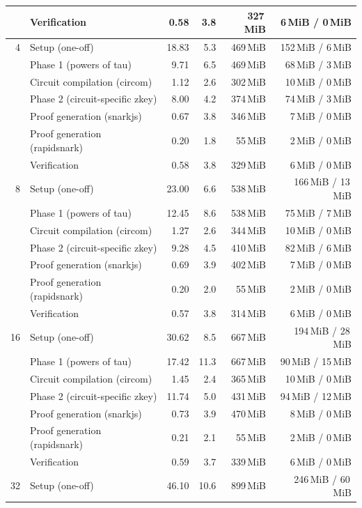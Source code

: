 \begin{table}[t]
{\begin{tabular}{|r|l|r|r|r|r|}
 & Verification & 0.58 & 3.8 & 327\,MiB & 6\,MiB / 0\,MiB \\
\hline
4 & Setup (one-off) & 18.83 & 5.3 & 469\,MiB & 152\,MiB / 6\,MiB \\
 & \quad Phase 1 (powers of tau) & 9.71 & 6.5 & 469\,MiB & 68\,MiB / 3\,MiB \\
 & \quad Circuit compilation (circom) & 1.12 & 2.6 & 302\,MiB & 10\,MiB / 0\,MiB \\
 & \quad Phase 2 (circuit-specific zkey) & 8.00 & 4.2 & 374\,MiB & 74\,MiB / 3\,MiB \\
 & Proof generation (snarkjs) & 0.67 & 3.8 & 346\,MiB & 7\,MiB / 0\,MiB \\
 & Proof generation (rapidsnark) & 0.20 & 1.8 & 55\,MiB & 2\,MiB / 0\,MiB \\
 & Verification & 0.58 & 3.8 & 329\,MiB & 6\,MiB / 0\,MiB \\
\hline
8 & Setup (one-off) & 23.00 & 6.6 & 538\,MiB & 166\,MiB / 13\,MiB \\
 & \quad Phase 1 (powers of tau) & 12.45 & 8.6 & 538\,MiB & 75\,MiB / 7\,MiB \\
 & \quad Circuit compilation (circom) & 1.27 & 2.6 & 344\,MiB & 10\,MiB / 0\,MiB \\
 & \quad Phase 2 (circuit-specific zkey) & 9.28 & 4.5 & 410\,MiB & 82\,MiB / 6\,MiB \\
 & Proof generation (snarkjs) & 0.69 & 3.9 & 402\,MiB & 7\,MiB / 0\,MiB \\
 & Proof generation (rapidsnark) & 0.20 & 2.0 & 55\,MiB & 2\,MiB / 0\,MiB \\
 & Verification & 0.57 & 3.8 & 314\,MiB & 6\,MiB / 0\,MiB \\
\hline
16 & Setup (one-off) & 30.62 & 8.5 & 667\,MiB & 194\,MiB / 28\,MiB \\
 & \quad Phase 1 (powers of tau) & 17.42 & 11.3 & 667\,MiB & 90\,MiB / 15\,MiB \\
 & \quad Circuit compilation (circom) & 1.45 & 2.4 & 365\,MiB & 10\,MiB / 0\,MiB \\
 & \quad Phase 2 (circuit-specific zkey) & 11.74 & 5.0 & 431\,MiB & 94\,MiB / 12\,MiB \\
 & Proof generation (snarkjs) & 0.73 & 3.9 & 470\,MiB & 8\,MiB / 0\,MiB \\
 & Proof generation (rapidsnark) & 0.21 & 2.1 & 55\,MiB & 2\,MiB / 0\,MiB \\
 & Verification & 0.59 & 3.7 & 339\,MiB & 6\,MiB / 0\,MiB \\
\hline
32 & Setup (one-off) & 46.10 & 10.6 & 899\,MiB & 246\,MiB / 60\,MiB \\

\end{tabular}}
\end{table}
